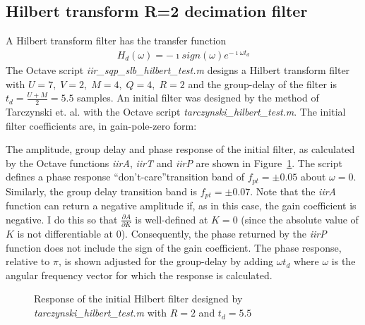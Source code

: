 \documentclass[a4paper,twoside,10pt,english]{report}
\begin{document}
\subsection{\label{sec:Hilbert-transform-R-2-decimation-filter}Hilbert transform R=2 decimation filter}
A Hilbert transform filter\cite[p.118]{Papoulis_SignalAnalysis} has the transfer
function 
\begin{align*}
H_{d}\left(\omega\right)=-\imath sign\left(\omega\right)e^{-\imath\omega t_{d}}
\end{align*}
The Octave script \emph{iir\_sqp\_slb\_hilbert\_test.m} designs a Hilbert
transform filter with $U=7,\;V=2,\;M=4,\;Q=4,\;R=2$ and the group-delay of the
filter is $t_{d}=\frac{U+M}{2}=5.5$ samples. An initial filter was designed by
the method of Tarczynski et. al. with the Octave script 
\emph{tarczynski\_hilbert\_test.m}. The initial filter coefficients are, in 
gain-pole-zero form:
\begin{small}

\end{small}
The amplitude, group delay and phase response of the initial filter, as
calculated by the Octave functions \emph{iirA}, \emph{iirT} and \emph{iirP}
are shown in Figure~\ref{fig:iir-sqp-slb-hilbert-initial-response}. The script
defines a phase response ``don't-care''transition band of $f_{pt}=\pm 0.05$
about $\omega=0$. Similarly, the group delay transition band is
$f_{pt}=\pm 0.07$.  Note that the \emph{iirA} function can return a negative
amplitude if, as in this case, the gain coefficient is negative. I do this so
that $\frac{\partial A}{\partial K}$ is well-defined at $K=0$ (since the
absolute value of $K$ is not differentiable at $0$). Consequently, the phase
returned by the \emph{iirP} function does not include the sign of the gain
coefficient.  The phase response, relative to $\pi$, is shown adjusted for the
group-delay by adding $\omega t_{d}$ where $\omega$ is the angular frequency
vector for which the response is calculated.
\begin{figure}[!htbp]
\begin{center}
\scalebox{0.7}{}
\caption{Response of the initial Hilbert filter designed by 
\emph{tarczynski\_hilbert\_test.m} with $R=2$ and $t_{d}=5.5$}
\label{fig:iir-sqp-slb-hilbert-initial-response}
\end{center}
\end{figure}
\end{document}
